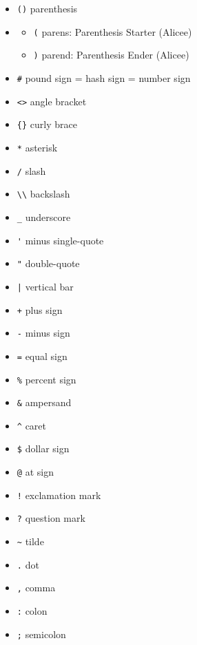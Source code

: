 \begin{itemize}

\item \verb|()| parenthesis
\item \begin{itemize}

\item \verb|(| parens: Parenthesis Starter (Alicee)
\item \verb|)| parend: Parenthesis Ender (Alicee)
\end{itemize}



\item \verb|#| pound sign = hash sign = number sign
\item \verb|<>| angle bracket
\item \verb|{}| curly brace
\item \verb|*| asterisk
\item \verb|/| slash
\item \verb|\\| backslash
\item \verb|_| underscore
\item \verb|'| minus single-quote
\item \verb|"| double-quote
\item \verb!|! vertical bar
\item \verb|+| plus sign
\item \verb|-| minus sign
\item \verb|=| equal sign
\item \verb|%| percent sign
\item \verb|&| ampersand
\item \verb|^| caret
\item \verb|$| dollar sign
\item \verb|@| at sign
\item \verb|!| exclamation mark
\item \verb|?| question mark
\item \verb|~| tilde
\item \verb|.| dot
\item \verb|,| comma
\item \verb|:| colon
\item \verb|;| semicolon
\end{itemize}

